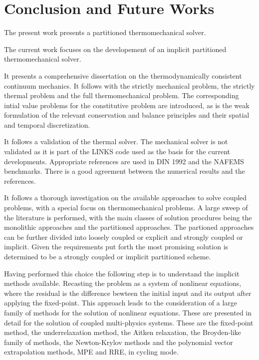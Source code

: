 \chapter{Conclusion and Future Works}

The present work presents a partitioned thermomechanical solver.

The current work focuses on the developement of an implicit partitioned thermomechanical solver.

It presents a comprehensive dissertation on the thermodynamically consistent continuum mechanics.
It follows with the strictly mechanical problem, the strictly thermal problem and the full thermomechanical problem.
The corresponding intial value problems for the constitutive problem are introduced, as is the weak formulation of the relevant conservation and balance principles and their spatial and temporal discretization.

It follows a validation of the thermal solver.
The mechanical solver is not validated as it is part of the LINKS code used as the basis for the current developments.
Appropriate references are used in DIN 1992 and the NAFEMS benchmarks.
There is a good agreement between the numerical results and the references.

It follows a thorough investigation on the available approaches to solve coupled problems, with a special focus on thermomechanical problems.
A large sweep of the literature is performed, with the main classes of solution procdures being the monolithic approaches and the partitioned approaches.
The partioned approaches can be further divided into loosely coupled or explicit and strongly coupled or implicit.
Given the requirements put forth the most promising solution is determined to be a strongly coupled or implicit partitioned scheme.

Having performed this choice the following step is to understand the implicit methods available.
Recasting the problem as a system of nonlinear equations, where the residual is the difference bewteen the initial input and its output after applying the fixed-point.
This approach leads to the consideration of a large family of methods for the solution of nonlinear equations.
These are presented in detail for the solution of coupled multi-physics systems.
These are the fixed-point method, the underrelaxation method, the Aitken relaxation, the Broyden-like family of methods, the Newton-Krylov methods and the polynomial vector extrapolation methods, MPE and RRE, in cycling mode.

